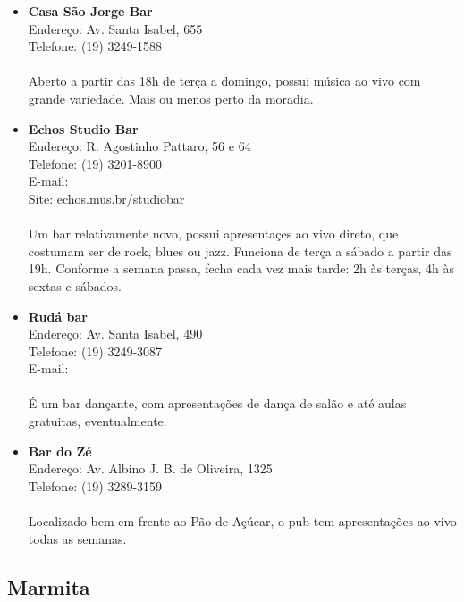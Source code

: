\begin{itemize}
\item \textbf{Casa São Jorge Bar}
  \\Endereço: Av. Santa Isabel, 655
  \\Telefone: (19) 3249-1588
  \\
  \\Aberto a partir das 18h de terça a domingo, possui música ao vivo com
  grande variedade. Mais ou menos perto da moradia.

\item \textbf{Echos Studio Bar}
  \\Endereço: R. Agostinho Pattaro, 56 e 64
  \\Telefone: (19) 3201-8900
  \\E-mail: 
  \\Site: \url{echos.mus.br/studiobar}
  \\
  \\Um bar relativamente novo, possui apresentaçes ao vivo direto, que costumam
  ser de rock, blues ou jazz. Funciona de terça a sábado a partir das 19h.
  Conforme a semana passa, fecha cada vez mais tarde: 2h às terças, 4h às
  sextas e sábados.

\item \textbf{Rudá bar}
  \\Endereço: Av. Santa Isabel, 490
  \\Telefone: (19) 3249-3087
  \\E-mail: 
  \\
  \\É um bar dançante, com apresentações de dança de salão e até aulas
  gratuitas, eventualmente.

\item \textbf{Bar do Zé}
  \\Endereço: Av. Albino J. B. de Oliveira, 1325
  \\Telefone: (19) 3289-3159
  \\
  \\Localizado bem em frente ao Pão de Açúcar, o pub tem apresentações ao vivo
  todas as semanas.
\end{itemize}

\subsection{Marmita}

